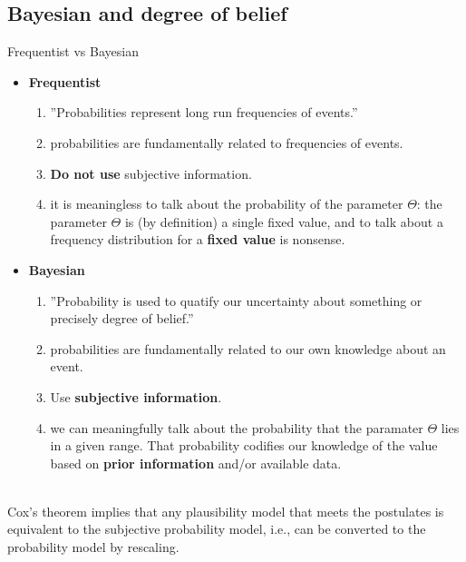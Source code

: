 \documentclass{bredelebeamer}
\begin{document}
\subsection{Bayesian and degree of belief}
\begin{frame}{Frequentist vs Bayesian}
    \begin{itemize}
      \item\begin{justify}
      \textbf{Frequentist}
        \begin{enumerate}
          \item ”Probabilities represent long run frequencies of events.”
          \item probabilities are fundamentally related to frequencies of events.
          \item \textbf{Do not use} subjective information.
          \item it is meaningless to talk about the probability of the parameter $\Theta$:
                the parameter $\Theta$ is (by definition) a single fixed value, and
                to talk about a frequency distribution for a \textbf{fixed value}
                is nonsense.
        \end{enumerate}
      \end{justify}
      \item\begin{justify}
      \textbf{Bayesian}
        \begin{enumerate}
          \item ”Probability is used to quatify our uncertainty about something or precisely degree of belief.”
          \item probabilities are fundamentally related to our own knowledge about an event.
          \item Use \textbf{subjective information}.
          \item we can meaningfully talk about the probability that the paramater $\Theta$
                lies in a given range. That probability codifies our knowledge of
                the value based on \textbf{prior information} and/or available data.
        \end{enumerate}
      \end{justify}
    \end{itemize}
  \vspace{\baselineskip}
   \\
    Cox's theorem implies that any plausibility model that meets the postulates
    is equivalent to the subjective probability model, i.e., can be converted to
    the probability model by rescaling.
\end{frame}
\end{document}
